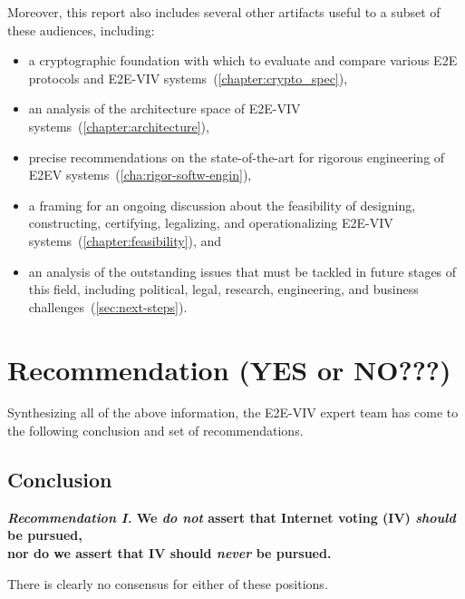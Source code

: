 Moreover, this report also includes several other artifacts useful to
a subset of these audiences, including:
\begin{itemize}
\item a cryptographic foundation with which to evaluate and compare
  various E2E protocols and E2E-VIV
  systems~(\autoref{chapter:crypto_spec}),
\item an analysis of the architecture space of E2E-VIV
  systems~(\autoref{chapter:architecture}),
\item precise recommendations on the state-of-the-art for rigorous
  engineering of E2EV systems~(\autoref{cha:rigor-softw-engin}),
\item a framing for an ongoing discussion about the feasibility of
  designing, constructing, certifying, legalizing, and operationalizing
  E2E-VIV systems~(\autoref{chapter:feasibility}), and
\item an analysis of the outstanding issues that must be tackled in
  future stages of this field, including political, legal, research,
  engineering, and business challenges~(\autoref{sec:next-steps}).
\end{itemize}

\section{Recommendation (YES or NO???)}

Synthesizing all of the above information, the E2E-VIV expert team has
come to the following conclusion and set of
recommendations. 

\subsection{Conclusion}
\label{sec:conclusion}

\begin{center}
  \textbf{\emph{Recommendation I.} We \emph{do not} assert that
    Internet voting (IV) \emph{should} be pursued,\\
    nor do we assert that IV should \emph{never} be pursued.}
\end{center}

There is clearly no consensus for either of these positions.

